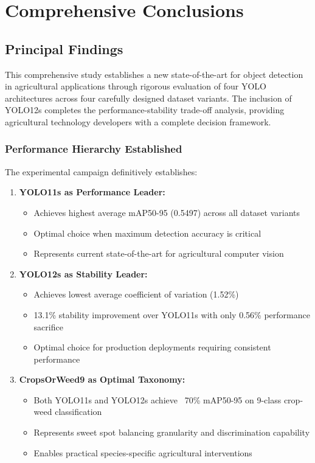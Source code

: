 \section{Comprehensive Conclusions}

\subsection{Principal Findings}

This comprehensive study establishes a new state-of-the-art for object detection in agricultural applications through rigorous evaluation of four YOLO architectures across four carefully designed dataset variants. The inclusion of YOLO12s completes the performance-stability trade-off analysis, providing agricultural technology developers with a complete decision framework.

\subsubsection{Performance Hierarchy Established}

The experimental campaign definitively establishes:

\begin{enumerate}
    \item \textbf{YOLO11s as Performance Leader:}
    \begin{itemize}
        \item Achieves highest average mAP50-95 (0.5497) across all dataset variants
        \item Optimal choice when maximum detection accuracy is critical
        \item Represents current state-of-the-art for agricultural computer vision
    \end{itemize}
    
    \item \textbf{YOLO12s as Stability Leader:}
    \begin{itemize}
        \item Achieves lowest average coefficient of variation (1.52\%)
        \item 13.1\% stability improvement over YOLO11s with only 0.56\% performance sacrifice
        \item Optimal choice for production deployments requiring consistent performance
    \end{itemize}
    
    \item \textbf{CropsOrWeed9 as Optimal Taxonomy:}
    \begin{itemize}
        \item Both YOLO11s and YOLO12s achieve ~70\% mAP50-95 on 9-class crop-weed classification
        \item Represents sweet spot balancing granularity and discrimination capability
        \item Enables practical species-specific agricultural interventions
    \end{itemize}
\end{enumerate}

